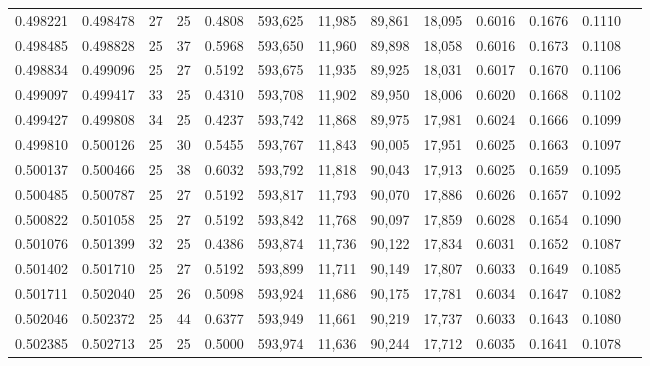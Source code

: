 \begin{tabular}{rrrrrrrrrrrrr}
0.498221 & 0.498478 &    27 &  25 &                                     0.4808 & 593,625 &  11,985 &  89,861 &  18,095 & 0.6016 & 0.1676 & 0.1110 \\
0.498485 & 0.498828 &    25 &  37 &                                     0.5968 & 593,650 &  11,960 &  89,898 &  18,058 & 0.6016 & 0.1673 & 0.1108 \\
0.498834 & 0.499096 &    25 &  27 &                                     0.5192 & 593,675 &  11,935 &  89,925 &  18,031 & 0.6017 & 0.1670 & 0.1106 \\
0.499097 & 0.499417 &    33 &  25 &                                     0.4310 & 593,708 &  11,902 &  89,950 &  18,006 & 0.6020 & 0.1668 & 0.1102 \\
0.499427 & 0.499808 &    34 &  25 &                                     0.4237 & 593,742 &  11,868 &  89,975 &  17,981 & 0.6024 & 0.1666 & 0.1099 \\
0.499810 & 0.500126 &    25 &  30 &                                     0.5455 & 593,767 &  11,843 &  90,005 &  17,951 & 0.6025 & 0.1663 & 0.1097 \\
0.500137 & 0.500466 &    25 &  38 &                                     0.6032 & 593,792 &  11,818 &  90,043 &  17,913 & 0.6025 & 0.1659 & 0.1095 \\
0.500485 & 0.500787 &    25 &  27 &                                     0.5192 & 593,817 &  11,793 &  90,070 &  17,886 & 0.6026 & 0.1657 & 0.1092 \\
0.500822 & 0.501058 &    25 &  27 &                                     0.5192 & 593,842 &  11,768 &  90,097 &  17,859 & 0.6028 & 0.1654 & 0.1090 \\
0.501076 & 0.501399 &    32 &  25 &                                     0.4386 & 593,874 &  11,736 &  90,122 &  17,834 & 0.6031 & 0.1652 & 0.1087 \\
0.501402 & 0.501710 &    25 &  27 &                                     0.5192 & 593,899 &  11,711 &  90,149 &  17,807 & 0.6033 & 0.1649 & 0.1085 \\
0.501711 & 0.502040 &    25 &  26 &                                     0.5098 & 593,924 &  11,686 &  90,175 &  17,781 & 0.6034 & 0.1647 & 0.1082 \\
0.502046 & 0.502372 &    25 &  44 &                                     0.6377 & 593,949 &  11,661 &  90,219 &  17,737 & 0.6033 & 0.1643 & 0.1080 \\
0.502385 & 0.502713 &    25 &  25 &                                     0.5000 & 593,974 &  11,636 &  90,244 &  17,712 & 0.6035 & 0.1641 & 0.1078 \\

\end{tabular}
